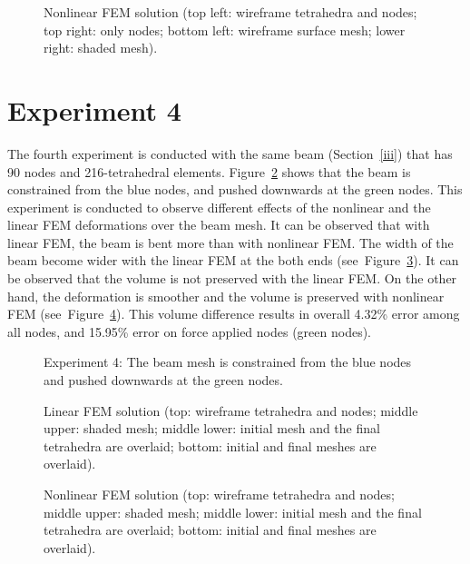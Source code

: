 \begin{figure}[c]
\centerline{}
\caption{Nonlinear FEM solution (top left: wireframe tetrahedra and nodes; top right: only nodes; bottom left: wireframe surface mesh; lower right: shaded mesh).}
\label{fig:fig10}
\end{figure}

\clearpage

\section{Experiment 4}
\label{iv}

The fourth experiment is conducted with the same beam (Section~\ref{iii}) that has 90 nodes and 216-tetrahedral elements. Figure~\ref{fig:fig11} shows that the beam is constrained from the blue nodes, and pushed downwards at the green nodes. This experiment is conducted to observe different effects of the nonlinear and the linear FEM deformations over the beam mesh.
It can be observed that with linear FEM, the beam is bent more than with nonlinear FEM. The width of the beam become wider with the linear FEM at the both ends (see~Figure~\ref{fig:fig12}). It can be observed that the volume is not preserved with the linear FEM. On the other hand, the deformation is smoother and the volume is preserved with nonlinear FEM (see~Figure~\ref{fig:fig13}). This volume difference results in overall 4.32\% error among all nodes, and 15.95\% error on force applied nodes (green nodes).

\begin{figure}[h]
\centerline{}
\caption{Experiment 4: The beam mesh is constrained from the blue nodes and pushed downwards at the green nodes.}
\label{fig:fig11}
\end{figure}

\begin{figure}[c]
\centerline{}
\caption{Linear FEM solution (top: wireframe tetrahedra and nodes; middle upper: shaded mesh; middle lower: initial mesh and the final tetrahedra are overlaid; bottom: initial and final meshes are overlaid).}
\label{fig:fig12}
\end{figure}

\begin{figure}[c]
\centerline{}
\caption{Nonlinear FEM solution (top: wireframe tetrahedra and nodes; middle upper: shaded mesh; middle lower: initial mesh and the final tetrahedra are overlaid; bottom: initial and final meshes are overlaid).}
\label{fig:fig13}
\end{figure}

